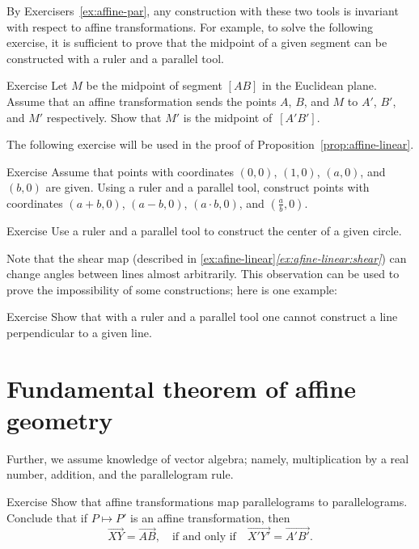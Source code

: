 By Exercisers~\ref{ex:affine-par}, any construction with these two tools is invariant with respect to affine transformations.
For example, 
to solve the following exercise,
it is sufficient to prove that the midpoint of a given segment can be constructed with a ruler and a parallel tool.

\begin{thm}{Exercise}\label{ex:midpoint-affine}
Let $M$ be the midpoint of segment $[AB]$ in the Euclidean plane.
Assume that an affine transformation sends the points $A$, $B$, and $M$
to $A'$, $B'$, and $M'$ respectively.
Show that $M'$ is the midpoint of~$[A'B']$.
\end{thm}

The following exercise will be used in the proof of Proposition~\ref{prop:affine-linear}.

\begin{thm}{Exercise}\label{ex:R-hom}
Assume that points with coordinates $(0,0)$, $(1,0)$, $(a,0)$, and $(b,0)$ are given.
Using a ruler and a parallel tool, construct points with coordinates $(a+b,0)$, $(a-b,0)$, $(a\cdot b,0)$, and $(\tfrac a b,0)$.
\end{thm}

\begin{thm}{Exercise}\label{ex:center-circ-affine}
Use a ruler and a parallel tool to construct the center of a given circle.
\end{thm}

Note that the shear map (described in \ref{ex:afine-linear}\textit{\ref{ex:afine-linear:shear}}) can change angles between lines almost arbitrarily.
This observation can be used to prove the impossibility of some constructions;
here is one example:

\begin{thm}{Exercise}\label{ex:affine-perp}
Show that with a ruler and a parallel tool one cannot construct a line perpendicular to a given line.
\end{thm}

\section{Fundamental theorem of affine geometry}

Further, we assume knowledge of vector algebra; namely, multiplication by a real number, addition, and the parallelogram rule.

\begin{thm}{Exercise}\label{ex:parallelogram-rule}
Show that affine transformations map parallelograms to parallelograms.
Conclude that if $P\mapsto P'$ is an affine transformation, then
\[\overrightarrow{XY}=\overrightarrow{AB},
\quad\text{if and only if}\quad
\overrightarrow{X'Y'}=\overrightarrow{A'B'}.\]

\end{thm}


